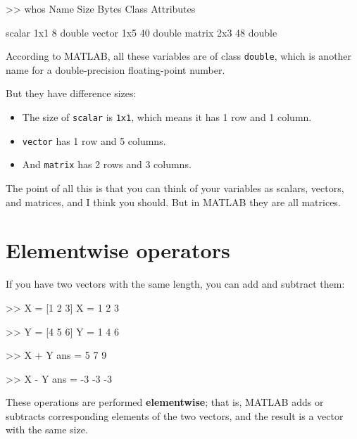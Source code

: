 \documentclass[
]{book}
\numberwithin{Answer}{chapter}
\numberwithin{Exercise}{chapter}
\begin{document}

\begin{code}
>> whos
  Name        Size            Bytes  Class     Attributes
              
  scalar      1x1                 8  double              
  vector      1x5                40  double              
  matrix      2x3                48  double              
\end{code}

According to MATLAB, all these variables are of class {\tt double}, which
is another name for a double-precision floating-point number.


But they have difference sizes: 

\begin{itemize}

\item The size of {\tt scalar} is {\tt 1x1}, which means it has 1 row and 1 column.  

\item {\tt vector} has 1 row and 5 columns.  

\item And {\tt matrix} has 2 rows and 3 columns.

\end{itemize}

The point of all this is that you can think of your variables as
scalars, vectors, and matrices, and I think you should.  But in MATLAB they are all matrices.


\section{Elementwise operators}
\label{elementwise}


If you have two vectors with the same length, you can add and subtract them:

\begin{code}
>> X = [1 2 3]
X = 1     2     3

>> Y = [4 5 6]
Y = 1     4     6

>> X + Y
ans = 5     7     9

>> X - Y
ans = -3    -3    -3
\end{code}

These operations are performed {\bf elementwise}; that is, MATLAB adds or subtracts corresponding elements of the two vectors, and the result is a vector with the same size.
\end{document}
